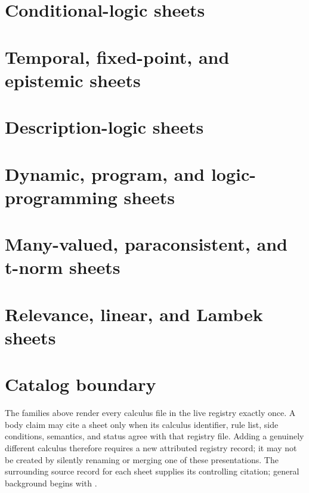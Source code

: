 \section{Conditional-logic sheets}

\section{Temporal, fixed-point, and epistemic sheets}

\section{Description-logic sheets}

\section{Dynamic, program, and logic-programming sheets}

\section{Many-valued, paraconsistent, and t-norm sheets}

\section{Relevance, linear, and Lambek sheets}

\section{Catalog boundary}

The families above render every calculus file in the live registry exactly
once. A body claim may cite a sheet only when
its calculus identifier, rule list, side conditions, semantics, and status
agree with that registry file. Adding a genuinely different calculus therefore
requires a new attributed registry record; it may not be created by silently
renaming or merging one of these presentations. The surrounding source record
for each sheet supplies its controlling citation; general background begins
with \cite{Prawitz1965,RobinsonVoronkov2001,BlackburnDeRijkeVenema2001}.
